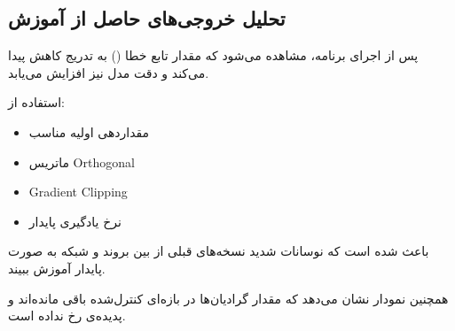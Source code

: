\documentclass[12pt,a4paper]{article}
\begin{document}

\subsection{تحلیل خروجی‌های حاصل از آموزش}

\begin{tcolorbox}[
colback=softgreen,
colframe=mygreen,
title={تحلیل رفتار مدل},
fonttitle=\bfseries
]

پس از اجرای برنامه، مشاهده می‌شود که مقدار تابع خطا
()
به تدریج کاهش پیدا می‌کند و دقت مدل نیز افزایش می‌یابد.

استفاده از:
\begin{itemize}
\item مقداردهی اولیه مناسب
\item ماتریس Orthogonal
\item Gradient Clipping
\item نرخ یادگیری پایدار
\end{itemize}

باعث شده است که نوسانات شدید نسخه‌های قبلی از بین بروند و شبکه
به صورت پایدار آموزش ببیند.

همچنین نمودار 
نشان می‌دهد که مقدار گرادیان‌ها در بازه‌ای کنترل‌شده باقی مانده‌اند
و پدیده‌ی 
رخ نداده است.

\end{tcolorbox}

\end{document}
